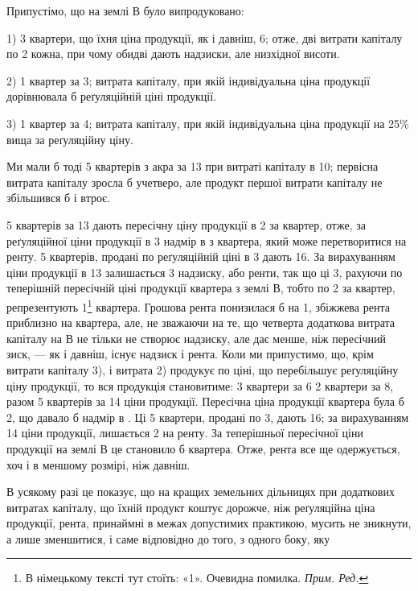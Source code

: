 Припустімо, що на землі $В$ було випродуковано:

1) 3 квартери, що їхня ціна продукції, як і давніш, 6; отже,
дві витрати капіталу по  2 кожна, при чому обидві дають надзиски,
але низхідної висоти.

2) 1 квартер за 3; витрата капіталу, при якій індивідуальна
ціна продукції дорівнювала б реґуляційній ціні продукції.

3) 1 квартер за 4; витрата капіталу, при якій індивідуальна
ціна продукції на 25\% вища за реґуляційну ціну.

Ми мали б тоді 5 квартерів з акра за 13 при витраті капіталу
в 10; первісна витрата капіталу зросла б учетверо, але продукт
першої витрати капіталу не збільшився б і втроє.

5 квартерів за 13 дають пересічну ціну продукції в 2
за квартер, отже, за реґуляційної ціни продукції в 3 надмір
в  з квартера, який може перетворитися на ренту.
5 квартерів, продані по реґуляційній ціні в 3 дають
16. За вирахуванням
ціни продукції в 13 залишається 3 надзиску, або
ренти, так що ці 3, рахуючи по теперішній пересічній ціні
продукції квартера з землі $В$, тобто по 2 за квартер,
репрезентують 1\footnote*{
В німецькому тексті тут стоїть: «1». Очевидна помилка. \emph{Прим. Ред.}
} квартера. Грошова рента понизилася б на 1, збіжжева
рента приблизно на  квартера, але, не зважаючи на те, що четверта додаткова
витрата капіталу на $В$ не тільки не створює надзиску, але дає менше, ніж
пересічний зиск, — як і давніш, існує надзиск і рента. Коли ми припустимо, що,
крім витрати капіталу 3), і витрата 2) продукує по ціні, що перебільшує реґуляційну
ціну продукції, то вся продукція становитиме: 3 квартери за
6 \dplus{} 2 квартери за 8, разом 5 квартерів за 14
ціни продукції. Пересічна ціна продукції квартера була б 2,
що давало б надмір в . Ці 5  квартери, продані по
3, дають 16; за вирахуванням
14 ціни продукції, лишається 2 на ренту. За теперішньої
пересічної ціни продукції на землі $В$ це становило б  квартера.
Отже, рента все ще одержується, хоч і в меншому розмірі, ніж давніш.

В усякому разі це показує, що на кращих земельних дільницях при додаткових
витратах капіталу, що їхній продукт коштує дорожче, ніж реґуляційна
ціна продукції, рента, принаймні в межах допустимих практикою, мусить не
зникнути, а лише зменшитися, і саме відповідно до того, з одного боку, яку
\parbreak{}  %
